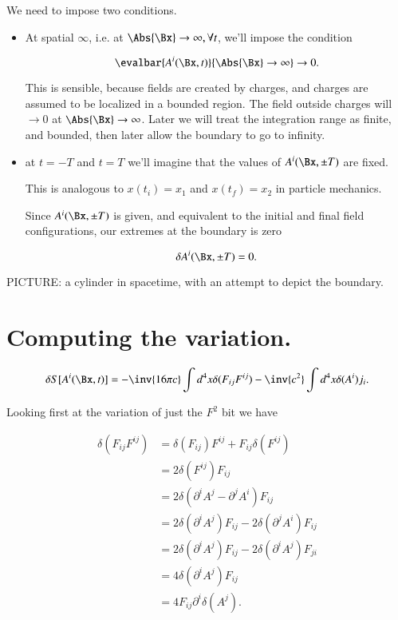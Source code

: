 We need to impose two conditions.
\begin{itemize}
\item At spatial $\infty$, i.e. at $\Abs{\Bx} \rightarrow \infty, \forall t$, we'll impose the condition

\begin{equation}\label{eqn:relativisticElectrodynamicsL13:150}
\evalbar{A^i(\Bx, t)}{\Abs{\Bx} \rightarrow \infty} \rightarrow 0.
\end{equation}

This is sensible, because fields are created by charges, and charges are assumed to be localized in a bounded region.  The field outside charges will $\rightarrow 0$ at $\Abs{\Bx} \rightarrow \infty$.  Later we will treat the integration range as finite, and bounded, then later allow the boundary to go to infinity.

\item at $t = -T$ and $t = T$ we'll imagine that the values of $A^i(\Bx, \pm T)$ are fixed.

This is analogous to $x(t_i) = x_1$ and $x(t_f) = x_2$ in particle mechanics.

Since $A^i(\Bx, \pm T)$ is given, and equivalent to the initial and final field configurations, our extremes at the boundary is zero

\begin{equation}\label{eqn:relativisticElectrodynamicsL13:170}
\delta A^i(\Bx, \pm T) = 0.
\end{equation}

\end{itemize}

PICTURE: a cylinder in spacetime, with an attempt to depict the boundary.

\section{Computing the variation.}

\begin{equation}\label{eqn:relativisticElectrodynamicsL13:190}
\delta S[A^i(\Bx, t)]
= -\inv{16 \pi c} \int d^4 x \delta (F_{ij}F^{ij}) - \inv{c^2} \int d^4 x \delta(A^i) j_i.
\end{equation}

Looking first at the variation of just the $F^2$ bit we have

\begin{align*}
\delta (F_{ij}F^{ij})
&=
\delta(F_{ij}) F^{ij} + F_{ij} \delta(F^{ij}) \\
&=
2 \delta(F^{ij}) F_{ij} \\
&=
2 \delta(\partial^i A^j - \partial^j A^i) F_{ij} \\
&=
2 \delta(\partial^i A^j) F_{ij} - 2 \delta(\partial^j A^i) F_{ij} \\
&=
2 \delta(\partial^i A^j) F_{ij} - 2 \delta(\partial^i A^j) F_{ji} \\
&=
4 \delta(\partial^i A^j) F_{ij} \\
&=
4 F_{ij} \partial^i \delta(A^j).
\end{align*}

